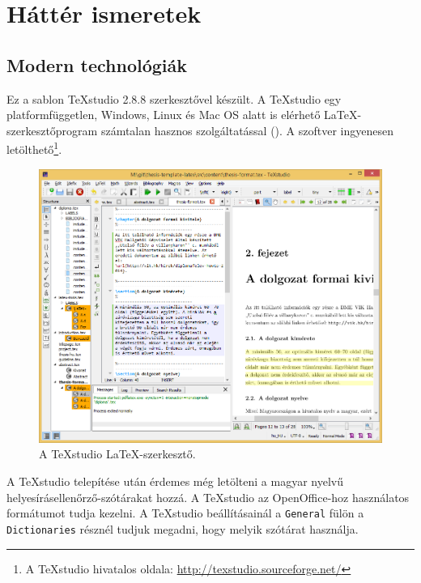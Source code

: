 \chapter{Háttér ismeretek}
\section{Modern technológiák}


Ez a sablon TeXstudio 2.8.8 szerkesztővel készült. A TeXstudio egy platformfüggetlen, Windows, Linux és Mac OS alatt is elérhető \LaTeX-szerkesztőprogram számtalan hasznos szolgáltatással (). A szoftver ingyenesen letölthető\footnote{A TeXstudio hivatalos oldala: \url{http://texstudio.sourceforge.net/}}.

\begin{figure}[!ht]
\centering
\includegraphics[width=150mm, keepaspectratio]{figures/TeXstudio.png}
\caption{A TeXstudio \LaTeX-szerkesztő.}
\label{fig:TeXstudio}
\end{figure}

A TeXstudio telepítése után érdemes még letölteni a magyar nyelvű helyesírásellenőrző-szótárakat hozzá. A TeXstudio az OpenOffice-hoz használatos formátumot tudja kezelni. A TeXstudio beállításainál a \verb+General+ fülön a \verb+Dictionaries+ résznél tudjuk megadni, hogy melyik szótárat használja.

